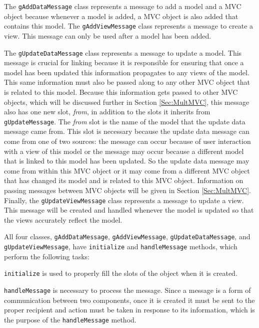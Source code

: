 \documentclass{article}[11pt]
\newcommand{\Rfunction}[1]{{\texttt{#1}}}
\newcommand{\Robject}[1]{{\texttt{#1}}}
\newcommand{\Rslot}[1]{\textsl{#1}}
\begin{document}
The \Robject{gAddDataMessage} class represents a message to add a model and a
MVC object because whenever a model is added, a MVC object is also added that
contains this model.  The \Robject{gAddViewMessage} class represents a message
to create a view.  This message can only be used after a model has been
added.  

The \Robject{gUpdateDataMessage} class represents a message to update
a model.  This message is crucial for linking because it is responsible for
ensuring that once a model has been updated this information propagates to
any views of the model.  This same information must also be passed along to any
other MVC object that is related to this model.  Because this information gets
passed to other MVC objects, which will be discussed further in Section
\ref{Sec:MultMVC}, this message also has one new slot, \Rslot{from}, in
addition to the slots it inherits from \Robject{gUpdateMessage}.  The
\Rslot{from} slot is the name of the model that the update data message came
from.  This slot is necessary because the update data message can come from
one of two sources: the message can occur because of user interaction with a
view of this model or the message may occur because a different model that is
linked to this model has been updated.  So the update data message may come
from within this MVC object or it may come from a different MVC object that
has changed its model and is related to this MVC object.  Information on
passing messages between MVC objects will be given in Section
\ref{Sec:MultMVC}.  Finally, the \Robject{gUpdateViewMessage} class represents
a message to update a view.  This message will be created and handled whenever
the model is updated so that the views accurately reflect the model.

All four classes, \Robject{gAddDataMessage}, \Robject{gAddViewMessage},
\Robject{gUpdateDataMessage}, and \Robject{gUpdateViewMessage}, have
\Rfunction{initialize} and \Rfunction{handleMessage} methods, which perform
the following tasks:

\begin{list}{}{\setlength{\leftmargin}{0.5in}
               \setlength{\itemsep}{0in}}
  \item \Rfunction{initialize} is used to properly fill the slots of the
object when it is created.  
  \item \Rfunction{handleMessage} is necessary to
process the message.  Since a message is a form of communication
between two components, once it is created it must be sent to the
proper recipient and action must be taken in response to its
information, which is the purpose of the \Rfunction{handleMessage} method.
\end{list}
\end{document}
